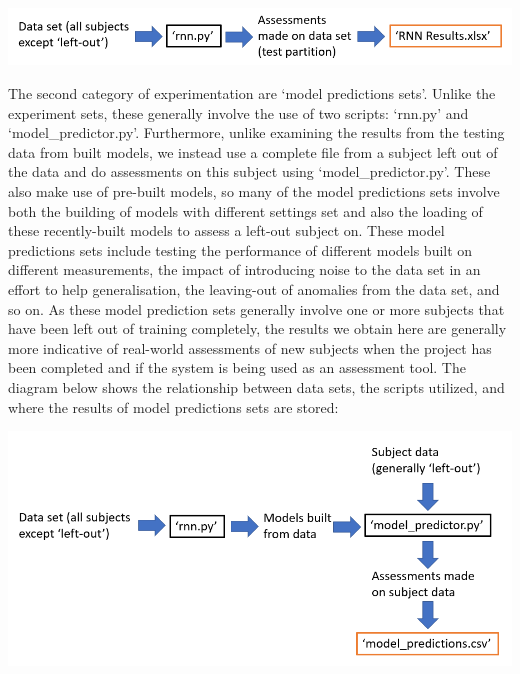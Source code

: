 \documentclass[12pt,twoside]{report}
\begin{document}
\begin{center}
\includegraphics[scale=0.5]{project_figures/fig10_1}
\end{center}

\quad The second category of experimentation are ‘model predictions sets’. Unlike the experiment sets, these generally involve the use of two scripts: ‘rnn.py’ and ‘model\_predictor.py’. Furthermore, unlike examining the results from the testing data from built models, we instead use a complete file from a subject left out of the data and do assessments on this subject using ‘model\_predictor.py’. These also make use of pre-built models, so many of the model predictions sets involve both the building of models with different settings set and also the loading of these recently-built models to assess a left-out subject on. These model predictions sets include testing the performance of different models built on different measurements, the impact of introducing noise to the data set in an effort to help generalisation, the leaving-out of anomalies from the data set, and so on. As these model prediction sets generally involve one or more subjects that have been left out of training completely, the results we obtain here are generally more indicative of real-world assessments of new subjects when the project has been completed and if the system is being used as an assessment tool. The diagram below shows the relationship between data sets, the scripts utilized, and where the results of model predictions sets are stored:

\begin{center}
\includegraphics[scale=0.5]{project_figures/fig10_2}
\end{center}
\end{document}
